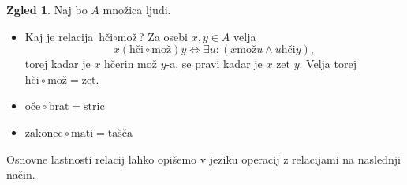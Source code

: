 \documentclass[11pt]{book}
\theoremstyle{definition}
\theoremstyle{zgled}
\newtheorem*{zgled}{Zgled}
\theoremstyle{odprtproblem}
\theoremstyle{domacanaloga}
\theoremstyle{izrek}
\begin{document}
\begin{zgled}
Naj bo $A$ množica ljudi.
\begin{itemize}
    \item Kaj je relacija $\text{hči} \circ \text{mož}$? Za osebi $x,y \in A$ velja
    \[
        x (\text{hči} \circ \text{mož}) y \Leftrightarrow
        \exists u \colon (x \text{mož} u \land u \text{hči} y),
    \]
    torej kadar je $x$ hčerin mož $y$-a, se pravi kadar je $x$ zet $y$. Velja torej $\text{hči} \circ \text{mož} = \text{zet}$.
    \item $\text{oče} \circ \text{brat} = \text{stric}$
    \item $\text{zakonec} \circ \text{mati} = \text{tašča}$
\end{itemize}
\end{zgled}

Osnovne lastnosti relacij lahko opišemo v jeziku operacij z relacijami na naslednji način.
\end{document}
